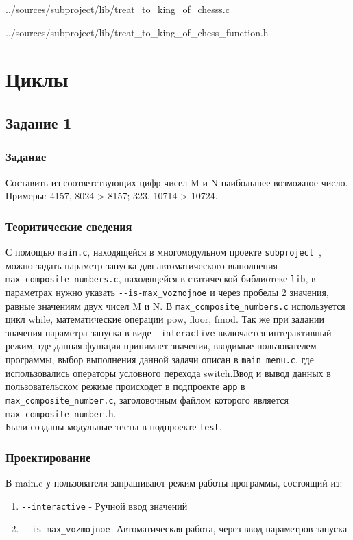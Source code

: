 \documentclass[12pt,a4paper]{report}
\begin{document}

{../sources/subproject/lib/treat_to_king_of_chesss.c}


{../sources/subproject/lib/treat_to_king_of_chess_function.h}

\chapter{Циклы}
\section{Задание 1}
\subsection{Задание}
Составить из соответствующих цифр чисел M и N наибольшее возможное число.
Примеры: 4157, 8024 > 8157; 323, 10714 > 10724.
\subsection{Теоритические сведения}
С помощью \verb+main.c+, находящейся в многомодульном проекте \verb+subproject +, можно задать параметр запуска для автоматического выполнения\\ 
\verb+max_composite_numbers.c+, находящейся в статической библиотеке \verb+lib+, в параметрах нужно указать 
\verb+--is-max_vozmojnoe+ и через пробелы 2 значения, равные значениям двух чисел M и N. В \verb+max_composite_numbers.c+ используется цикл while, математические операции pow, floor, fmod. Так же при задании значения параметра запуска в виде\verb+--interactive+ включается интерактивный режим, где данная функция принимает значения, вводимые пользователем программы, выбор выполнения данной задачи описан в \verb+main_menu.c+, где использовались операторы условного перехода switch.Ввод и вывод данных в пользовательском режиме происходет в подпроекте \verb+app+ в 
\verb+max_composite_number.c+, заголовочным файлом которого является \verb+max_composite_number.h+. \\ 
Были созданы модульные тесты в подпроекте \verb+test+. 
\subsection{Проектирование}
В main.c у пользователя запрашивают режим работы программы, состоящий из:
\begin{enumerate}
\item \verb+--interactive+ - Ручной ввод значений
\item \verb+--is-max_vozmojnoe+- Автоматическая работа, через ввод параметров запуска
\end{enumerate}
\end{document}

